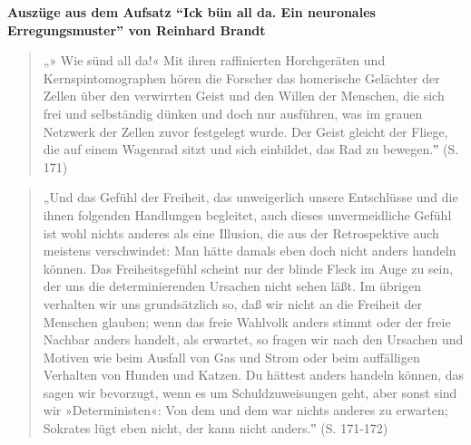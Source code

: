 \documentclass[
  a4paper,
]{report}
\begin{document}
\textbf{Auszüge aus dem Aufsatz ``Ick bün all da. Ein neuronales Erregungsmuster'' von Reinhard Brandt \citeyearpar{Brandt2004}}

\begin{quote}
„» Wie sünd all da!« Mit ihren raffinierten Horchgeräten und Kernspintomographen hören die Forscher das homerische Gelächter der Zellen über den verwirrten Geist und den Willen der Menschen, die sich frei und selbständig dünken und doch nur ausführen, was im grauen Netzwerk der Zellen zuvor festgelegt wurde. Der Geist gleicht der Fliege, die auf einem Wagenrad sitzt und sich einbildet, das Rad zu bewegen.‟ (S. 171)
\end{quote}

\begin{quote}
„Und das Gefühl der Freiheit, das unweigerlich unsere Entschlüsse und die ihnen folgenden Handlungen begleitet, auch dieses unvermeidliche Gefühl ist wohl nichts anderes als eine Illusion, die aus der Retrospektive auch meistens verschwindet: Man hätte damals eben doch nicht anders handeln können. Das Freiheitsgefühl scheint nur der blinde Fleck im Auge zu sein, der uns die determinierenden Ursachen nicht sehen läßt. Im übrigen verhalten wir uns grundsätzlich so, daß wir nicht an die Freiheit der Menschen glauben; wenn das freie Wahlvolk anders stimmt oder der freie Nachbar anders handelt, als erwartet, so fragen wir nach den Ursachen und Motiven wie beim Ausfall von Gas und Strom oder beim auffälligen Verhalten von Hunden und Katzen. Du hättest anders handeln können, das sagen wir bevorzugt, wenn es um Schuldzuweisungen geht, aber sonst sind wir »Deterministen«: Von dem und dem war nichts anderes zu erwarten; Sokrates lügt eben nicht, der kann nicht anders.‟ (S. 171-172)
\end{quote}
\end{document}
